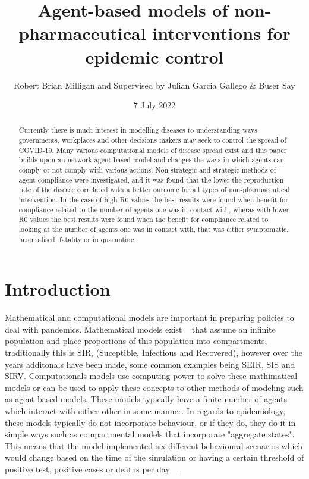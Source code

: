 \documentclass{article}
\title{Agent-based models of non-pharmaceutical interventions for epidemic control}
\author{Robert Brian Milligan and Supervised by Julian Garcia Gallego \& Buser Say}
\date{7 July 2022}
\begin{document}
\maketitle

\begin{abstract}
Currently there is much interest in modelling diseases to understanding ways governments, workplaces and other decisions makers may seek to control the spread of COVID-19. Many various computational models of disease spread exist and this paper builds upon an network agent based model and changes the ways in which agents can comply or not comply with various actions. Non-strategic and strategic methods of agent compliance were investigated, and it was found that the lower the reproduction rate of the disease correlated with a better outcome for all types of non-pharmaceutical intervention. In the case of high R0 values the best results were found when benefit for compliance related to the number of agents one was in contact with, wheras with lower R0 values the best results were found when the benefit for compliance related to looking at the number of agents one was in contact with, that was either symptomatic, hospitalised, fatality or in quarantine.
\end{abstract}



\tableofcontents

\newpage 

\section{Introduction}

Mathematical and computational models are important in preparing policies to deal with pandemics. Mathematical models exist ~\cite{cooper_mondal_antonopoulos_2020} that assume an infinite population and place proportions of this population into compartments, traditionally this is SIR, (Suceptible, Infectious and Recovered), however over the years additonals have been made, some common examples being SEIR, SIS and SIRV. Computationals models use computing power to solve these mathimatical models or can be used to apply these concepts to other methods of modeling such as agent based models. These models typically have a finite number of agents which interact with either other in some manner. In regards to epidemiology, these models typically do not incorporate behaviour, or if they do, they do it in simple ways such as compartmental models that incorporate "aggregate states". This means that the model implemented six different behavioural scenarios which would change based on the time of the simulation or having a certain threshold of positive test, positive cases or deaths per day ~\cite{karaivanov_2020}.\linebreak
\end{document}
